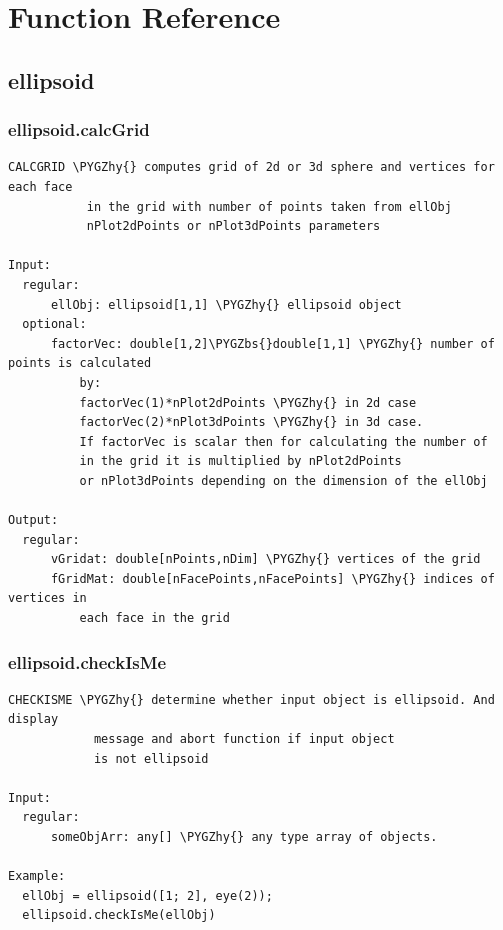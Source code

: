 \documentclass[letterpaper,10pt,english]{sphinxmanual}
\def\PYGZbs{\char`\\}
\def\PYGZhy{\char`\-}
\begin{document}
\chapter{Function Reference}
\label{chap_functions::doc}\label{chap_functions:function-reference}

\section{ellipsoid}
\label{chap_functions:ellipsoid}

\subsection{ellipsoid.calcGrid}
\label{chap_functions:ellipsoid-calcgrid}
\begin{Verbatim}[commandchars=\\\{\}]
CALCGRID \PYGZhy{} computes grid of 2d or 3d sphere and vertices for each face
           in the grid with number of points taken from ellObj
           nPlot2dPoints or nPlot3dPoints parameters

Input:
  regular:
      ellObj: ellipsoid[1,1] \PYGZhy{} ellipsoid object
  optional:
      factorVec: double[1,2]\PYGZbs{}double[1,1] \PYGZhy{} number of points is calculated
          by:
          factorVec(1)*nPlot2dPoints \PYGZhy{} in 2d case
          factorVec(2)*nPlot3dPoints \PYGZhy{} in 3d case.
          If factorVec is scalar then for calculating the number of
          in the grid it is multiplied by nPlot2dPoints
          or nPlot3dPoints depending on the dimension of the ellObj

Output:
  regular:
      vGridat: double[nPoints,nDim] \PYGZhy{} vertices of the grid
      fGridMat: double[nFacePoints,nFacePoints] \PYGZhy{} indices of vertices in
          each face in the grid
\end{Verbatim}


\subsection{ellipsoid.checkIsMe}
\label{chap_functions:ellipsoid-checkisme}
\begin{Verbatim}[commandchars=\\\{\}]
CHECKISME \PYGZhy{} determine whether input object is ellipsoid. And display
            message and abort function if input object
            is not ellipsoid

Input:
  regular:
      someObjArr: any[] \PYGZhy{} any type array of objects.

Example:
  ellObj = ellipsoid([1; 2], eye(2));
  ellipsoid.checkIsMe(ellObj)
\end{Verbatim}
\end{document}

